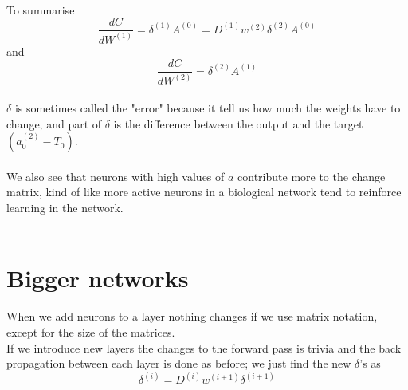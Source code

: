 \documentclass{article}
\begin{document}
\\
To summarise 
\[
\frac{dC}{dW^{(1)}} = \delta^{(1)} A^{(0)} = D^{(1)} w^{(2)} \delta^{(2)}  A^{(0)}
\]
and
\[
\frac{dC}{dW^{(2)}} = \delta^{(2)} A^{(1)} 
\]
\\
$\delta$ is sometimes called the "error" because it tell us how much the weights have to change, and part of $\delta$ is the difference between the output and the target $(a_{0}^{(2)}-T_0)$.
\\
\\
We also see that neurons with high values of $a$ contribute more to the change matrix, kind of like more active neurons in a biological network tend to reinforce learning in the network.
\\
\\
\section*{Bigger networks}
When we add neurons to a layer nothing changes if we use matrix notation, except for the size of the matrices.
\\
If we introduce new layers the changes to the forward pass is trivia and the back propagation between each layer is done as before; we just find the new $\delta$'s as $$\delta^{(i)} = D^{(i)} w^{(i+1)} \delta^{(i+1)}$$
\\
\\
\end{document}
